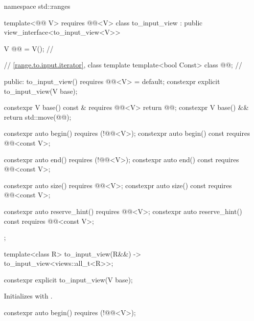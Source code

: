 %
\begin{codeblock}
namespace std::ranges {
  template<@@ V>
    requires @@<V>
  class to_input_view : public view_interface<to_input_view<V>> {
    V @@ = V();                        // \expos

    // \ref{range.to.input.iterator}, class template 
    template<bool Const> class @@;  // \expos

  public:
    to_input_view() requires @@<V> = default;
    constexpr explicit to_input_view(V base);

    constexpr V base() const & requires @@<V> { return @@; }
    constexpr V base() && { return std::move(@@); }

    constexpr auto begin() requires (!@@<V>);
    constexpr auto begin() const requires @@<const V>;

    constexpr auto end() requires (!@@<V>);
    constexpr auto end() const requires @@<const V>;

    constexpr auto size() requires @@<V>;
    constexpr auto size() const requires @@<const V>;

    constexpr auto reserve_hint() requires @@<V>;
    constexpr auto reserve_hint() const requires @@<const V>;
  };

  template<class R>
    to_input_view(R&&) -> to_input_view<views::all_t<R>>;
}
\end{codeblock}

%
\begin{itemdecl}
constexpr explicit to_input_view(V base);
\end{itemdecl}

\begin{itemdescr}
\pnum
\effects
Initializes  with .
\end{itemdescr}

%
\begin{itemdecl}
constexpr auto begin() requires (!@@<V>);
\end{itemdecl}

